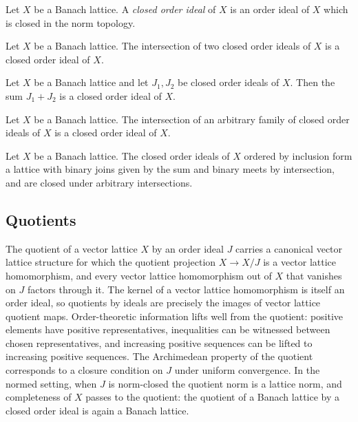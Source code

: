 \begin{definition}
\label{def:closed-order-ideal}
\leanok
{}
Let $X$ be a Banach lattice. A \emph{closed order ideal} of $X$ is
an order ideal of $X$ which is closed in the norm topology.
\end{definition}

\begin{lemma}
\label{lem:closedOrderIdeal-inf}
\leanok
{}
Let $X$ be a Banach lattice. The intersection of two closed order
ideals of $X$ is a closed order ideal of $X$.
\end{lemma}

\begin{lemma}
\label{lem:closedOrderIdeal-sup}
\leanok
{}
Let $X$ be a Banach lattice and let $J_1, J_2$ be closed order
ideals of $X$. Then the sum $J_1 + J_2$ is a closed order ideal of
$X$.
\end{lemma}

\begin{lemma}
\label{lem:closedOrderIdeal-sInf}
\leanok
{}
Let $X$ be a Banach lattice. The intersection of an arbitrary
family of closed order ideals of $X$ is a closed order ideal of
$X$.
\end{lemma}

\begin{lemma}
\label{lem:closedOrderIdeal-lattice}
\leanok
{}
Let $X$ be a Banach lattice. The closed order ideals of $X$
ordered by inclusion form a lattice with binary joins given by the
sum and binary meets by intersection, and are closed under
arbitrary intersections.
\end{lemma}

\subsection{Quotients}

The quotient of a vector lattice $X$ by an order ideal $J$ carries
a canonical vector lattice structure for which the quotient
projection $X \to X / J$ is a vector lattice homomorphism, and
every vector lattice homomorphism out of $X$ that vanishes on $J$
factors through it. The kernel of a vector lattice homomorphism is
itself an order ideal, so quotients by ideals are precisely the
images of vector lattice quotient maps. Order-theoretic information
lifts well from the quotient: positive elements have positive
representatives, inequalities can be witnessed between chosen
representatives, and increasing positive sequences can be lifted to
increasing positive sequences. The Archimedean property of the
quotient corresponds to a closure condition on $J$ under uniform
convergence. In the normed setting, when $J$ is norm-closed the
quotient norm is a lattice norm, and completeness of $X$ passes to
the quotient: the quotient of a Banach lattice by a closed order
ideal is again a Banach lattice.


